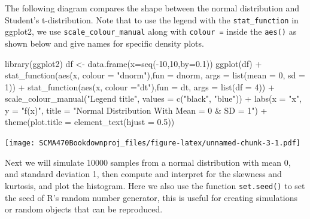 \documentclass[
]{book}
\newenvironment{Shaded}{\begin{snugshade}}{\end{snugshade}}
\newcommand{\AttributeTok}[1]{\textcolor[rgb]{0.77,0.63,0.00}{#1}}
\newcommand{\DecValTok}[1]{\textcolor[rgb]{0.00,0.00,0.81}{#1}}
\newcommand{\FloatTok}[1]{\textcolor[rgb]{0.00,0.00,0.81}{#1}}
\newcommand{\FunctionTok}[1]{\textcolor[rgb]{0.00,0.00,0.00}{#1}}
\newcommand{\NormalTok}[1]{#1}
\newcommand{\OtherTok}[1]{\textcolor[rgb]{0.56,0.35,0.01}{#1}}
\newcommand{\SpecialCharTok}[1]{\textcolor[rgb]{0.00,0.00,0.00}{#1}}
\newcommand{\StringTok}[1]{\textcolor[rgb]{0.31,0.60,0.02}{#1}}
\theoremstyle{definition}
\theoremstyle{definition}
\theoremstyle{definition}
\theoremstyle{definition}
\theoremstyle{remark}
\begin{document}
The following diagram compares the shape between the normal distribution and Student's t-distribution. Note that to use the legend with the \texttt{stat\_function} in ggplot2, we use \texttt{scale\_colour\_manual} along with \texttt{colour\ =} inside the \texttt{aes()} as shown below and give names for specific density plots.

\begin{Shaded}
\begin{Highlighting}[]
\FunctionTok{library}\NormalTok{(ggplot2)}
\NormalTok{df }\OtherTok{\textless{}{-}} \FunctionTok{data.frame}\NormalTok{(}\AttributeTok{x=}\FunctionTok{seq}\NormalTok{(}\SpecialCharTok{{-}}\DecValTok{10}\NormalTok{,}\DecValTok{10}\NormalTok{,}\AttributeTok{by=}\FloatTok{0.1}\NormalTok{))}
\FunctionTok{ggplot}\NormalTok{(df) }\SpecialCharTok{+} 
    \FunctionTok{stat\_function}\NormalTok{(}\FunctionTok{aes}\NormalTok{(x, }\AttributeTok{colour =} \StringTok{"dnorm"}\NormalTok{),}\AttributeTok{fun =}\NormalTok{ dnorm, }\AttributeTok{args =} \FunctionTok{list}\NormalTok{(}\AttributeTok{mean =} \DecValTok{0}\NormalTok{, }\AttributeTok{sd =} \DecValTok{1}\NormalTok{))  }\SpecialCharTok{+} 
    \FunctionTok{stat\_function}\NormalTok{(}\FunctionTok{aes}\NormalTok{(x, }\AttributeTok{colour =}\StringTok{"dt"}\NormalTok{),}\AttributeTok{fun =}\NormalTok{ dt, }\AttributeTok{args =} \FunctionTok{list}\NormalTok{(}\AttributeTok{df =} \DecValTok{4}\NormalTok{)) }\SpecialCharTok{+}
     \FunctionTok{scale\_colour\_manual}\NormalTok{(}\StringTok{"Legend title"}\NormalTok{, }\AttributeTok{values =} \FunctionTok{c}\NormalTok{(}\StringTok{"black"}\NormalTok{, }\StringTok{"blue"}\NormalTok{)) }\SpecialCharTok{+} 
    \FunctionTok{labs}\NormalTok{(}\AttributeTok{x =} \StringTok{"x"}\NormalTok{, }\AttributeTok{y =} \StringTok{"f(x)"}\NormalTok{, }
       \AttributeTok{title =} \StringTok{"Normal Distribution With Mean = 0 \& SD = 1"}\NormalTok{) }\SpecialCharTok{+} 
  \FunctionTok{theme}\NormalTok{(}\AttributeTok{plot.title =} \FunctionTok{element\_text}\NormalTok{(}\AttributeTok{hjust =} \FloatTok{0.5}\NormalTok{))}
\end{Highlighting}
\end{Shaded}

\texttt{[image: SCMA470Bookdownproj\_files/figure-latex/unnamed-chunk-3-1.pdf]}

Next we will simulate 10000 samples from a normal distribution with mean 0, and standard deviation 1, then compute and interpret for the skewness and kurtosis, and plot the histogram. Here we also use
the function \texttt{set.seed()} to set the seed of R's random number generator, this is useful for creating simulations or random objects that can be reproduced.
\end{document}
